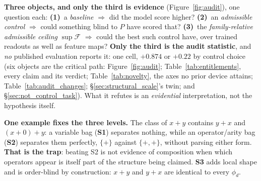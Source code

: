 \noindent\textbf{Three objects, and only the third is evidence} (Figure~\ref{fig:audit}), one question each: \textbf{(1)}~a \emph{baseline} $\Rightarrow$ did the model score higher? \textbf{(2)}~an \emph{admissible control} $\Rightarrow$ could something blind to $P$ have scored that? \textbf{(3)}~the \emph{family-relative admissible ceiling} $\sup\mathcal{F}$ $\Rightarrow$ could the best such control have, over trained readouts as well as feature maps? \textbf{Only the third is the audit statistic}, and \emph{no} published evaluation reports it: one cell, $+0.874$ or $+0.22$ by control choice (six objects are the critical path: Figure~\ref{fig:audit}; Table~\ref{tab:entitlements}, every claim and its verdict; Table~\ref{tab:novelty}, the axes no prior device attains; Table~\ref{tab:audit_changes}; \S\ref{sec:structural_scale}'s twin; and \S\ref{sec:not_control_task}). What it refutes is an \emph{evidential} interpretation, not the hypothesis itself.

\noindent\textbf{One example fixes the three levels.} The class of $x{+}y$ contains $y{+}x$ and $(x{+}0){+}y$: a variable bag (\textbf{S1}) separates nothing, while an operator/arity bag (\textbf{S2}) separates them perfectly, $\{+\}$ against $\{+,+\}$, without parsing either form. \textbf{That is the trap}: beating S2 is not evidence of composition when which operators appear is itself part of the structure being claimed. \textbf{S3} adds local shape and is order-blind by construction: $x{+}y$ and $y{+}x$ are identical to every $\phi_d$.

